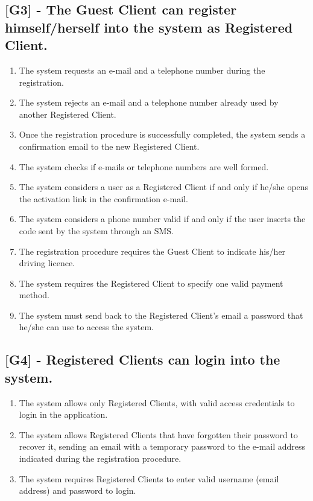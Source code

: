 \subsection{[G3] - The Guest Client can register himself/herself into the system as Registered Client.}
\begin{enumerate}[label=\textbf{R3.\arabic*)}]
\item The system requests an e-mail and a telephone number during the registration.
\item The system rejects an e-mail and a telephone number already used by another Registered Client.
\item Once the registration procedure is successfully completed, the system sends a confirmation email to the new Registered Client.
\item The system checks if e-mails or telephone numbers are well formed.
\item The system considers a user as a Registered Client if and only if he/she opens the activation link in the confirmation e-mail.
\item The system considers a phone number valid if and only if the user inserts the code sent by the system through an SMS.
\item The registration procedure requires the Guest Client to indicate his/her driving licence.
\item The system requires the Registered Client to specify one valid payment method.
\item The system must send back to the Registered Client’s email a password that he/she can use to access the system.
\end{enumerate}

\subsection{[G4] - Registered Clients can login into the system.}
\begin{enumerate}[label=\textbf{R4.\arabic*)}]
\item The system allows only Registered Clients, with valid access credentials to login in the application.
\item The system allows Registered Clients that have forgotten their password to recover it, sending an email with a temporary password to the e-mail address indicated during the registration procedure.
\item The system requires Registered Clients to enter valid username (email address) and password to login.
\end{enumerate}

